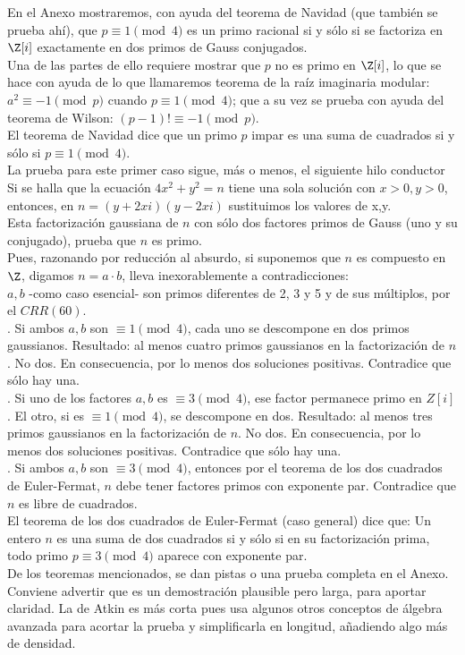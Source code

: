 En el Anexo mostraremos, con ayuda del teorema de Navidad (que también se prueba ahí), que $p \equiv 1 \pmod 4$ es un primo racional si y sólo si se factoriza en $\Z[i]$ exactamente en dos primos de Gauss conjugados. \\
Una de las partes de ello requiere mostrar que $p$ no es primo en $\Z[i]$, lo que se hace con ayuda de lo que llamaremos teorema de la raíz imaginaria modular: $a^2 \equiv -1 \pmod p$ cuando $p \equiv 1 \pmod 4$; que a su vez se prueba con ayuda del teorema de Wilson: $(p-1)! \equiv -1 \pmod p$. \\

El teorema de Navidad dice que un primo $p$ impar es una suma de cuadrados si y sólo si $p \equiv 1 \pmod 4$. \\

La prueba para este primer caso sigue, más o menos, el siguiente hilo conductor \\
Si se halla que la ecuación $4x^2+ y^2 = n$ tiene una sola solución con $x>0, y>0$, entonces, en $n =  (y + 2xi)(y - 2xi)$ sustituimos los valores de x,y. \\
Esta factorización gaussiana de $n$ con sólo dos factores primos de Gauss (uno y su conjugado), prueba que $n$ es primo. \\
Pues, razonando por reducción al absurdo, si suponemos que $n$ es compuesto en $\Z$, digamos $n=a \cdot b$, lleva inexorablemente a contradicciones: \\
$a,b$ -como caso esencial- son primos diferentes de 2, 3 y 5 y de sus múltiplos, por el $CRR(60)$. \\
. Si ambos $a,b$ son $\equiv 1 \pmod 4$, cada uno se descompone en dos primos gaussianos. Resultado: al menos cuatro primos gaussianos en la factorización de $n$. No dos. En consecuencia, por lo menos dos soluciones positivas. Contradice que sólo hay una. \\
. Si uno de los factores $a,b$ es $\equiv 3 \pmod 4$, ese factor permanece primo en $Z[i]$ . El otro, si es $\equiv 1 \pmod 4$, se descompone en dos. Resultado: al menos tres primos gaussianos en la factorización de $n$. No dos. En consecuencia, por lo menos dos soluciones positivas. Contradice que sólo hay una.\\
. Si ambos $a,b$ son $\equiv 3 \pmod 4$, entonces por el teorema de los dos cuadrados de Euler-Fermat, $n$ debe tener factores primos con exponente par. Contradice que $n$ es libre de cuadrados. \\

El teorema de los dos cuadrados de Euler-Fermat (caso general) dice que: Un entero $n$ es una suma de dos cuadrados si y sólo si en su factorización prima, todo primo $p \equiv 3 \pmod 4$ aparece con exponente par. \\
De los teoremas mencionados, se dan pistas o una prueba completa en el Anexo. \\
Conviene advertir que es un demostración plausible pero larga, para aportar claridad. La de Atkin es más corta pues usa algunos otros conceptos de álgebra avanzada para acortar la prueba y simplificarla en longitud, añadiendo algo más de densidad. \\


